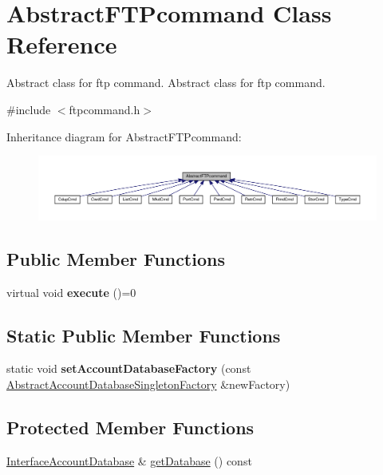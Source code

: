 \hypertarget{classAbstractFTPcommand}{}\section{Abstract\+F\+T\+Pcommand Class Reference}
\label{classAbstractFTPcommand}


Abstract class for ftp command.  Abstract class for ftp command.  




{\ttfamily \#include $<$ftpcommand.\+h$>$}



Inheritance diagram for Abstract\+F\+T\+Pcommand\+:\nopagebreak
\begin{figure}[H]
\begin{center}
\leavevmode
\includegraphics[width=350pt]{db/dab/classAbstractFTPcommand__inherit__graph}
\end{center}
\end{figure}
\subsection*{Public Member Functions}
\begin{DoxyCompactItemize}
\item 
\mbox{\label{classAbstractFTPcommand_a11d459d4fda2bf6125706648d8e94a36}} 
virtual void {\bfseries execute} ()=0
\end{DoxyCompactItemize}
\subsection*{Static Public Member Functions}
\begin{DoxyCompactItemize}
\item 
\mbox{\label{classAbstractFTPcommand_a7d84c3fe6d23e3d73cee642957f8f45f}} 
static void {\bfseries set\+Account\+Database\+Factory} (const \hyperlink{classAbstractAccountDatabaseSingletonFactory}{Abstract\+Account\+Database\+Singleton\+Factory} \&new\+Factory)
\end{DoxyCompactItemize}
\subsection*{Protected Member Functions}
\begin{DoxyCompactItemize}
\item 
\hyperlink{classInterfaceAccountDatabase}{Interface\+Account\+Database} \& \hyperlink{classAbstractFTPcommand_a22bac678c35be37939d485fb866f759e}{get\+Database} () const
\end{DoxyCompactItemize}


